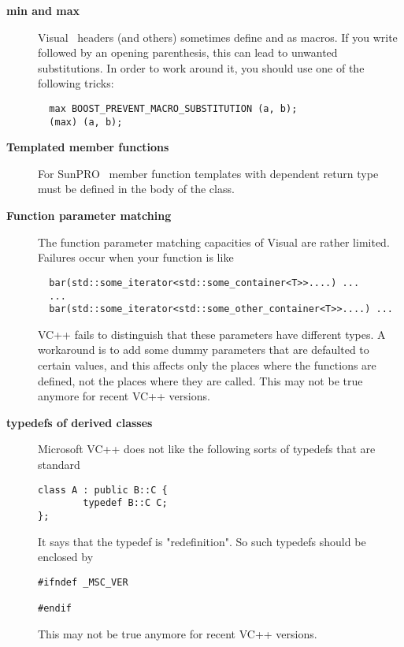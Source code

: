 \begin{description}
\item[\textbf{min and max}]
Visual \CC\ headers (and others) sometimes define  and  as macros. If you write  followed by an opening parenthesis, this can lead to unwanted substitutions. In order to work around it, you should use one of the following tricks:
\begin{verbatim}
  max BOOST_PREVENT_MACRO_SUBSTITUTION (a, b);
  (max) (a, b);
\end{verbatim}

\item[\textbf{Templated member functions}]

For SunPRO \CC\, member function templates with dependent return type
must be defined in the body of the class. 

\item[\textbf{Function parameter matching}]

The function parameter matching capacities of Visual \CC are rather limited. 
Failures occur when your function  is like
\begin{verbatim}
  bar(std::some_iterator<std::some_container<T>>....) ...
  ...
  bar(std::some_iterator<std::some_other_container<T>>....) ...
\end{verbatim}
VC++ fails to distinguish that these parameters have different types.
A workaround is to add some dummy parameters that are defaulted to
certain values, and this affects only the places where the functions
are defined, not the places where they are called.
This may not be true anymore for recent VC++ versions.

\item[\textbf{typedefs of derived classes}]
Microsoft VC++ does not like the following sorts of typedefs that are 
standard
\begin{verbatim}
class A : public B::C {
        typedef B::C C;
};
\end{verbatim}
It says that the typedef is "redefinition".  So such typedefs should be 
enclosed by
\begin{verbatim}
#ifndef _MSC_VER

#endif
\end{verbatim}
This may not be true anymore for recent VC++ versions.
\end{description}




